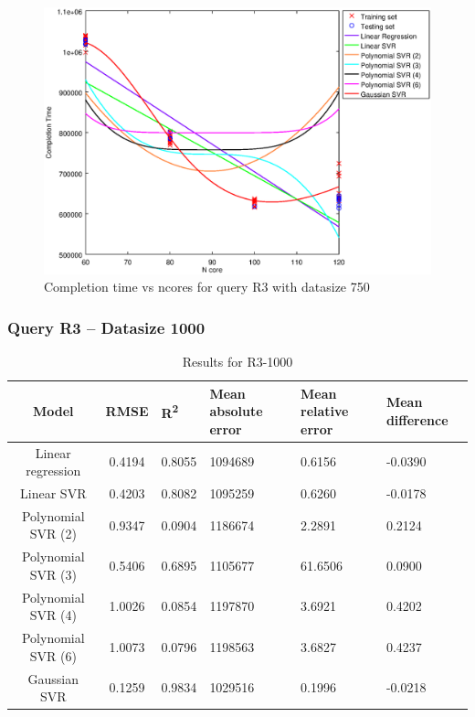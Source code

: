 \documentclass[a4paper,11pt]{article}
\begin{document}
\begin {figure}[hbtp]
\centering
\includegraphics[width=\textwidth]{output/R3_750_ONLY_1_LINEAR_NCORE/plot_R3_750.eps}
\caption{Completion time vs ncores for query R3 with datasize 750}
\label{fig:coreonly_linear_R3_750}
\end {figure}

\newpage
\subsubsection{Query R3 -- Datasize 1000}
\begin{table}[H]
	\centering
	\begin{adjustbox}{center}
		\begin{tabular}{c | c M{1.2cm} M{2.5cm} M{2.5cm} M{1.8cm}}
			Model & RMSE & R\textsuperscript{2} & Mean absolute error & Mean relative error & Mean difference \tabularnewline
			\hline
			Linear regression & 0.4194 & 0.8055 & 1094689 & 0.6156 & -0.0390 \\
			Linear SVR & 0.4203 & 0.8082 & 1095259 & 0.6260 & -0.0178 \\
			Polynomial SVR (2) & 0.9347 & 0.0904 & 1186674 & 2.2891 & 0.2124 \\
			Polynomial SVR (3) & 0.5406 & 0.6895 & 1105677 & 61.6506 & 0.0900 \\
			Polynomial SVR (4) & 1.0026 & 0.0854 & 1197870 & 3.6921 & 0.4202 \\
			Polynomial SVR (6) & 1.0073 & 0.0796 & 1198563 & 3.6827 & 0.4237 \\
			Gaussian SVR & 0.1259 & 0.9834 & 1029516 & 0.1996 & -0.0218 \\
		\end{tabular}
	\end{adjustbox}
	\\
	\caption{Results for R3-1000}
	\label{fig:coreonly_linear_R3_1000}
\end{table}
\end{document}
